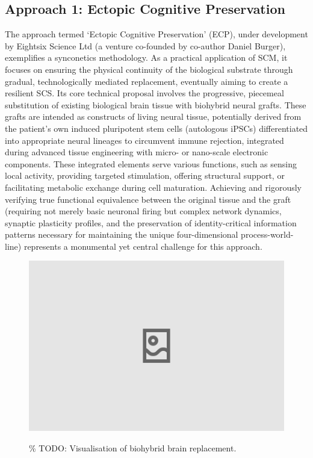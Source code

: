 \documentclass[10pt]{article}
\begin{document}
\begin{sloppypar}
  \subsection{Approach 1: Ectopic Cognitive Preservation}
  \label{sec:daniel-approach}

  The approach termed ‘Ectopic Cognitive Preservation’ (ECP), under development by Eightsix Science Ltd (a venture co-founded by co-author Daniel Burger), exemplifies a synconetics methodology. As a practical application of SCM, it focuses on ensuring the physical continuity of the biological substrate through gradual, technologically mediated replacement, eventually aiming to create a resilient SCS. Its core technical proposal involves the progressive, piecemeal substitution of existing biological brain tissue with biohybrid neural grafts. These grafts are intended as constructs of living neural tissue, potentially derived from the patient’s own induced pluripotent stem cells (autologous iPSCs) differentiated into appropriate neural lineages to circumvent immune rejection, integrated during advanced tissue engineering with micro- or nano-scale electronic components. These integrated elements serve various functions, such as sensing local activity, providing targeted stimulation, offering structural support, or facilitating metabolic exchange during cell maturation. Achieving and rigorously verifying true functional equivalence between the original tissue and the graft (requiring not merely basic neuronal firing but complex network dynamics, synaptic plasticity profiles, and the preservation of identity-critical information patterns necessary for maintaining the unique four-dimensional process-world-line) represents a monumental yet central challenge for this approach.

  \begin{figure}[ht]
    \centering
    \includegraphics[width=\textwidth]{figures/ecp-brain-replacement.png}
    \label{fig:ecp-replacement}
    \caption{\% TODO: Visualisation of biohybrid brain replacement.}
  \end{figure}


\end{sloppypar}
\end{document}
